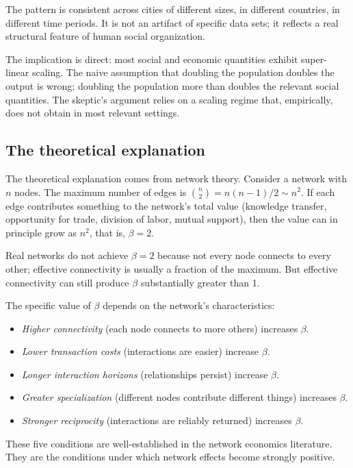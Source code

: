 The pattern is consistent across cities of different sizes, in
different countries, in different time periods. It is not an
artifact of specific data sets; it reflects a real structural
feature of human social organization.

The implication is direct: most social and economic quantities
exhibit super-linear scaling. The naive assumption that doubling
the population doubles the output is wrong; doubling the
population more than doubles the relevant social quantities. The
skeptic's argument relies on a scaling regime that, empirically,
does not obtain in most relevant settings.

\subsection{The theoretical explanation}

The theoretical explanation comes from network theory. Consider a
network with $n$ nodes. The maximum number of edges is
$\binom{n}{2} = n(n-1)/2 \sim n^2$. If each edge contributes
something to the network's total value (knowledge transfer,
opportunity for trade, division of labor, mutual support), then
the value can in principle grow as $n^2$, that is, $\beta = 2$.

Real networks do not achieve $\beta = 2$ because not every node
connects to every other; effective connectivity is usually a
fraction of the maximum. But effective connectivity can still
produce $\beta$ substantially greater than 1.

The specific value of $\beta$ depends on the network's
characteristics:

\begin{itemize}[leftmargin=2em]
    \item \emph{Higher connectivity} (each node connects to more
    others) increases $\beta$.
    \item \emph{Lower transaction costs} (interactions are easier)
    increase $\beta$.
    \item \emph{Longer interaction horizons} (relationships
    persist) increase $\beta$.
    \item \emph{Greater specialization} (different nodes
    contribute different things) increases $\beta$.
    \item \emph{Stronger reciprocity} (interactions are reliably
    returned) increases $\beta$.
\end{itemize}

These five conditions are well-established in the network economics
literature. They are the conditions under which network effects
become strongly positive.

